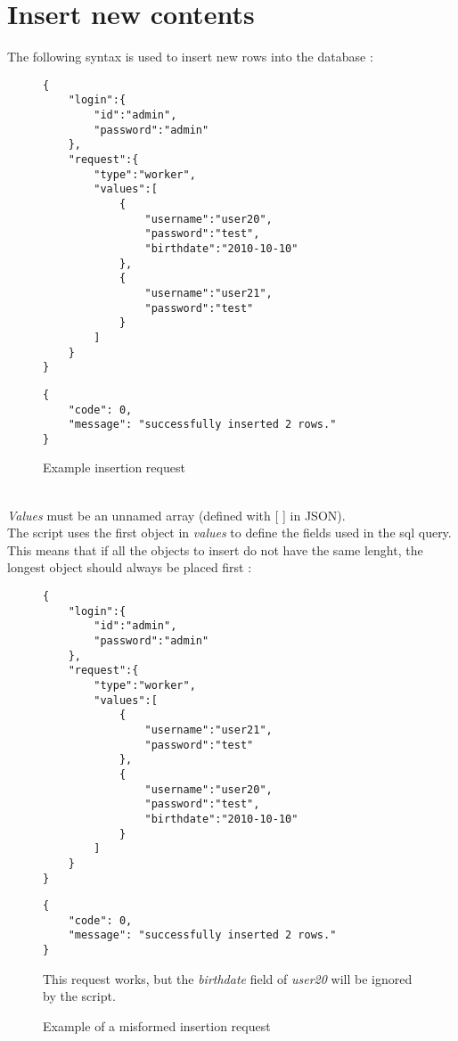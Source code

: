 \documentclass[notitlepage]{report}
\begin{document}
\section{Insert new contents}
The following syntax is used to insert new rows into the database :
\begin{figure}[h]
\centering
\begin{minipage}{.45\linewidth}
\begin{verbatim}
{
    "login":{   
        "id":"admin",
        "password":"admin"
    },
    "request":{
        "type":"worker",
        "values":[
            {
                "username":"user20",
                "password":"test",
                "birthdate":"2010-10-10"
            },
            {
                "username":"user21",
                "password":"test"
            }
        ]
    }
}
\end{verbatim}
\end{minipage}
\begin{minipage}{.45\linewidth}
\begin{verbatim}
{
    "code": 0,
    "message": "successfully inserted 2 rows."
}
\end{verbatim}
\end{minipage}
\caption{Example insertion request}
\end{figure}
\\
\emph{Values} must be an unnamed array (defined with [ ] in JSON). \\
The script uses the first object in \emph{values} to define the fields used in the sql query. This means that if all the objects to insert do not have the same lenght, the longest object should always be placed first :
\begin{figure}[h]
\centering
\begin{minipage}{.45\linewidth}
\begin{verbatim}
{
    "login":{   
        "id":"admin",
        "password":"admin"
    },
    "request":{
        "type":"worker",
        "values":[
            {
                "username":"user21",
                "password":"test"
            },
            {
                "username":"user20",
                "password":"test",
                "birthdate":"2010-10-10"
            }
        ]
    }
}
\end{verbatim}
\end{minipage}
\begin{minipage}{.45\linewidth}
\begin{verbatim}
{
    "code": 0,
    "message": "successfully inserted 2 rows."
}
\end{verbatim}
This request works, but the \emph{birthdate} field of \emph{user20} will be ignored by the script.
\end{minipage}
\caption{Example of a misformed insertion request}
\end{figure}
\end{document}
